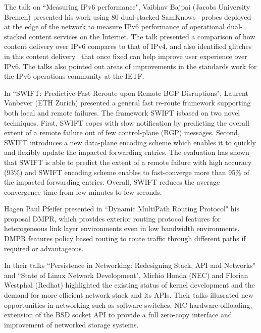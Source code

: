 The talk on ``Measuring IPv6 performance", Vaibhav Bajpai (Jacobs University
Bremen) presented his work using 80
dual-stacked SamKnows~\cite{vbajpai:comst:2015} probes deployed at the edge of
the network to measure IPv6 performance of operational dual-stacked content
services on the Internet. The talk presented a comparison of how content delivery
\cite{vbajpai:networking:2015, sahsan:pam:2015} over IPv6 compares to that of
IPv4, and also identified glitches in this content
delivery~\cite{seravuchira:cnsm:2016} that once fixed can help improve user
experience over IPv6. The talks also pointed out areas of improvements
\cite{vbajpai:anrw:2016} in the standards work for the IPv6 operations
community at the IETF\@.


In ``SWIFT: Predictive Fast Reroute upon Remote BGP Disruptions",
Laurent Vanbever (ETH Zurich) presented a general
fast re-route framework supporting both local and remote failures. The framework
SWIFT isbased on two novel techniques. First, SWIFT copes with slow notification by
predicting the overall extent of a remote failure out of few control-plane
(BGP) messages. Second, SWIFT introduces a new data-plane encoding scheme
which enables it to quickly and flexibly update the impacted forwarding
entries. The evaluation has shown that SWIFT is able to predict the extent of
a remote failure with high accuracy (93\%) and SWIFT encoding scheme enables
to fast-converge more than 95\% of the impacted forwarding entries. Overall,
SWIFT reduces the average convergence time from few minutes to few seconds.

Hagen Paul Pfeifer presented in ``Dynamic MultiPath Routing Protocol" his 
proposal \ac{DMPR}, which provides exterior routing protocol features for
heterogeneous link layer environments even in low bandwidth environments.
\ac{DMPR} features policy based routing to route traffic through
different paths if required or advantageous.

In their talks ``Persistence in Networking: Redesigning Stack, API and Networks"
and ``State of Linux Network Development", Michio Honda (NEC) and 
Florian Westphal (Redhat) highlighted the existing status of kernel
development and the demand for more efficient network stack and
its APIs. Their talks illusrated new opportunities in networking such as software
switches, NIC hardware offloading, extension of the BSD socket API to 
provide a full zero-copy interface and improvement of networked
storage systems.

